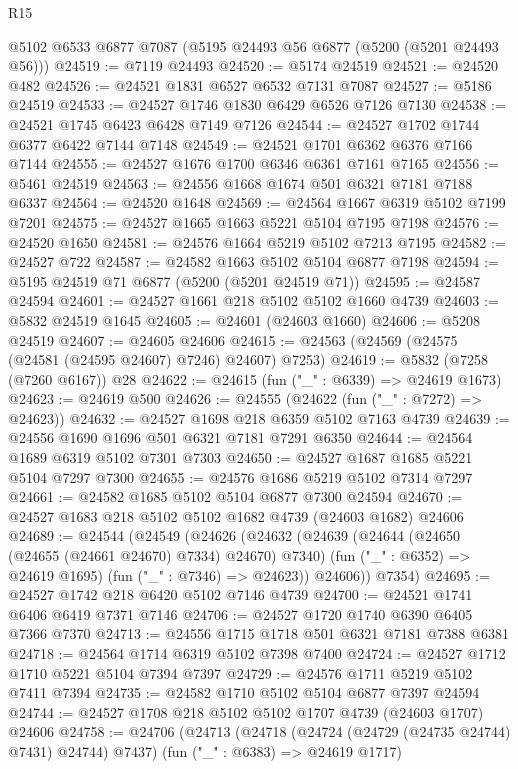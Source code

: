 \begin{lexlean}{R15}
\begin{coremodule}
{{{{{{{{{{{    @5102
    @6533
    @6877
    @7087
    (@5195 @24493 @56 @6877 (@5200 (@5201 @24493 @56)))
@24519 := @7119 @24493
@24520 := @5174 @24519
@24521 := @24520 @482
@24526 := @24521 @1831 @6527 @6532 @7131 @7087
@24527 := @5186 @24519
@24533 := @24527 @1746 @1830 @6429 @6526 @7126 @7130
@24538 := @24521 @1745 @6423 @6428 @7149 @7126
@24544 := @24527 @1702 @1744 @6377 @6422 @7144 @7148
@24549 := @24521 @1701 @6362 @6376 @7166 @7144
@24555 := @24527 @1676 @1700 @6346 @6361 @7161 @7165
@24556 := @5461 @24519
@24563 := @24556 @1668 @1674 @501 @6321 @7181 @7188 @6337
@24564 := @24520 @1648
@24569 := @24564 @1667 @6319 @5102 @7199 @7201
@24575 := @24527 @1665 @1663 @5221 @5104 @7195 @7198
@24576 := @24520 @1650
@24581 := @24576 @1664 @5219 @5102 @7213 @7195
@24582 := @24527 @722
@24587 := @24582 @1663 @5102 @5104 @6877 @7198
@24594 := @5195 @24519 @71 @6877 (@5200 (@5201 @24519 @71))
@24595 := @24587 @24594
@24601 := @24527 @1661 @218 @5102 @5102 @1660 @4739
@24603 := @5832 @24519 @1645
@24605 := @24601 (@24603 @1660)
@24606 := @5208 @24519
@24607 := @24605 @24606
@24615 := @24563 (@24569 (@24575 (@24581 (@24595 @24607) @7246) @24607) @7253)
@24619 := @5832 (@7258 (@7260 @6167)) @28
@24622 := @24615 (fun ("_" : @6339) => @24619 @1673)
@24623 := @24619 @500
@24626 := @24555 (@24622 (fun ("_" : @7272) => @24623))
@24632 := @24527 @1698 @218 @6359 @5102 @7163 @4739
@24639 := @24556 @1690 @1696 @501 @6321 @7181 @7291 @6350
@24644 := @24564 @1689 @6319 @5102 @7301 @7303
@24650 := @24527 @1687 @1685 @5221 @5104 @7297 @7300
@24655 := @24576 @1686 @5219 @5102 @7314 @7297
@24661 := @24582 @1685 @5102 @5104 @6877 @7300 @24594
@24670 := @24527 @1683 @218 @5102 @5102 @1682 @4739 (@24603 @1682) @24606
@24689 := @24544
    (@24549
      (@24626
        (@24632
          (@24639
            (@24644 (@24650 (@24655 (@24661 @24670) @7334) @24670) @7340)
            (fun ("_" : @6352) => @24619 @1695)
            (fun ("_" : @7346) => @24623))
          @24606))
      @7354)
@24695 := @24527 @1742 @218 @6420 @5102 @7146 @4739
@24700 := @24521 @1741 @6406 @6419 @7371 @7146
@24706 := @24527 @1720 @1740 @6390 @6405 @7366 @7370
@24713 := @24556 @1715 @1718 @501 @6321 @7181 @7388 @6381
@24718 := @24564 @1714 @6319 @5102 @7398 @7400
@24724 := @24527 @1712 @1710 @5221 @5104 @7394 @7397
@24729 := @24576 @1711 @5219 @5102 @7411 @7394
@24735 := @24582 @1710 @5102 @5104 @6877 @7397 @24594
@24744 := @24527 @1708 @218 @5102 @5102 @1707 @4739 (@24603 @1707) @24606
@24758 := @24706
    (@24713
      (@24718 (@24724 (@24729 (@24735 @24744) @7431) @24744) @7437)
      (fun ("_" : @6383) => @24619 @1717)
}}}}}}}}}}}
\end{coremodule}
\end{lexlean}
